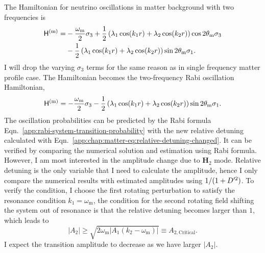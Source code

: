 The Hamiltonian for neutrino oscillations in matter background with two frequencies is
\begin{align}
  \mathsf H^{(\mm)} =& - \frac{\omega_\mm}{2}\sigma_3  + \frac{1}{2} \left( \lambda_1 \cos(k_1 r) + \lambda_2 \cos(k_2 r) \right) \cos 2\theta_\mm \sigma_3 \nonumber\\
   &- \frac{1}{2} \left( \lambda_1 \cos(k_1 r) + \lambda_2 \cos(k_2 r)\right)\sin 2\theta_\mm \sigma_1.
  \label{eq-hamiltonian-bg-matter-basis-multi-frequency}
\end{align}
I will drop the varying $\sigma_3$ terms for the same reason as in single frequency matter profile case. The Hamiltonian becomes the two-frequency Rabi oscillation Hamiltonian,
\begin{equation}
  \mathsf H^{(\mm)} = - \frac{\omega_\mm}{2}\sigma_3  - \frac{1}{2} \left( \lambda_1 \cos(k_1 r) + \lambda_2 \cos(k_2 r)\right)\sin 2\theta_\mm \sigma_1.
  \label{eq-hamiltonian-bg-matter-basis-multi-frequency-drop-varying-sigma3}
\end{equation}
The oscillation probabilities can be predicted by the Rabi formula Eqn.~\ref{app:rabi-system-transition-probability} with the new relative detuning calculated with Eqn.~\ref{app:chap:matter-eq:relative-detuning-changed}. It can be verified by comparing the numerical solution and estimation using Rabi formula. However, I am most interested in the amplitude change due to $\mathbf H_2$ mode. Relative detuning is the only variable that I need to calculate the amplitude, hence I only compare the numerical results with estimated amplitudes using $1/(1+D'^2)$.
To verify the condition, I choose the first rotating perturbation to satisfy the resonance condition $k_1=\omega_{\mathrm{m}}$, the condition for the second rotating field shifting the system out of resonance is that the relative detuning becomes larger than $1$, which leads to
\begin{equation}
\lvert A_2 \rvert \geq \sqrt{2\omega_{\mathrm{m}} \lvert A_1 (k_2-\omega_{\mathrm m})\rvert} \equiv A_{2,\mathrm{Critical}}.
\end{equation}
I expect the transition amplitude to decrease as we have larger $\lvert A_2\rvert$.


